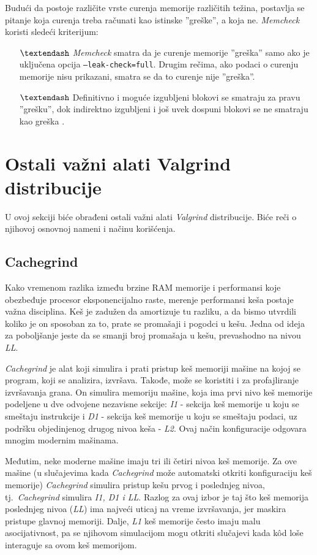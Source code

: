 \documentclass[12pt,oneside]{memoir}
\theoremstyle{plain}
\theoremstyle{definition}
\begin{document}
Budući da postoje različite vrste curenja memorije različitih težina, postavlja se pitanje koja curenja treba računati kao istinske ''greške'', a koja ne. \textit{Memcheck} koristi sledeći kriterijum:
\begin{itemize}
\item[$\textendash$] \textit{Memcheck} smatra da je curenje memorije ''greška'' samo ako je uključena opcija \texttt{--leak-check=full}. Drugim rečima, ako podaci o curenju memorije nisu prikazani, smatra se da to curenje nije ''greška''.
\item[$\textendash$] Definitivno i moguće izgubljeni blokovi se smatraju za pravu ''grešku'', dok indirektno izgubljeni i još uvek dospuni blokovi se ne smatraju kao greška \cite{Memcheck}. 
\end{itemize}

\section{Ostali važni alati Valgrind distribucije}

U ovoj sekciji biće obrađeni ostali važni alati \textit{Valgrind} distribucije. Biće reči o njihovoj osnovnoj nameni i načinu korišćenja. 

\subsection{Cachegrind}
Kako vremenom razlika između brzine RAM memorije i performansi koje obezbeđuje procesor eksponencijalno raste, merenje performansi keša postaje važna disciplina. Keš je zadužen da amortizuje tu razliku, a da bismo utvrdili koliko je on sposoban za to, prate se promašaji i pogodci u kešu. Jedna od  ideja za poboljšanje jeste da se smanji broj promašaja u kešu, prevashodno na nivou \textit{LL}.

\textit{Cachegrind} je alat koji simulira i prati pristup keš memoriji mašine na kojoj se program, koji se analizira, izvršava. Takođe, može se koristiti i za profajliranje izvršavanja grana. On simulira memoriju mašine, koja ima prvi nivo keš memorije podeljene u dve odvojene nezavisne sekcije: \textit{I1} - sekcija keš memorije u koju se smeštaju instrukcije i \textit{D1} - sekcija keš memorije u koju se smeštaju podaci, uz podršku objedinjenog drugog nivoa keša - \textit{L2}. Ovaj način konfiguracije odgovara mnogim modernim mašinama.


Međutim, neke moderne mašine imaju tri ili četiri nivoa keš memorije. Za ove mašine (u slučajevima kada \textit{Cachegrind} može automatski otkriti konfiguraciju keš memorije) \textit{Cachegrind} simulira pristup kešu prvog i poslednjeg nivoa, tj.~\textit{Cachegrind} simulira \textit{I1, D1 i LL}. Razlog za ovaj izbor je taj što keš memorija poslednjeg nivoa (\textit{LL}) ima najveći uticaj na vreme izvršavanja, jer maskira pristupe glavnoj memoriji. Dalje, \textit{L1} keš memorije često imaju malu asocijativnost, pa se njihovom simulacijom mogu otkriti slučajevi kada k\^od loše interaguje sa ovom keš memorijom.
\end{document}
